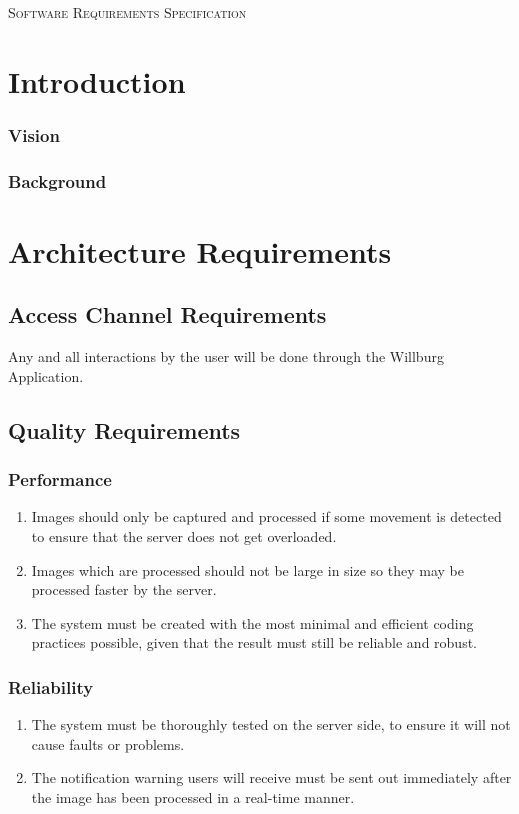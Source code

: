 \documentclass[a4paper,12pt]{report}
\begin{document}
\renewcommand{\thesection}{\arabic{section}}
\newpage
\begin{center}
\textsc{\LARGE Software Requirements Specification}\\[1.5cm]
\end{center}



\section{Introduction}

 \subsubsection{Vision}
 
\subsubsection{Background}
	
\section{Architecture Requirements}
\subsection{Access Channel Requirements}
Any and all interactions by the user will be done through the Willburg Application.
\subsection{Quality Requirements}
\subsubsection{Performance}
\begin{enumerate}
	\item Images should only be captured and processed if some movement is detected to ensure that the server does not get overloaded.
	\item Images which are processed should not be large in size so they may be processed faster by the server.
	\item The system must be created with the most minimal and efficient coding
	practices possible, given that the result must still be reliable and robust.
\end{enumerate}
\subsubsection{Reliability}
\begin{enumerate}
	\item The system must be thoroughly tested on the server side, to
	ensure it will not cause faults or problems. 
	\item The notification warning users will receive must be sent out immediately after the image has been processed in a real-time manner.
\end{enumerate}
\end{document}
